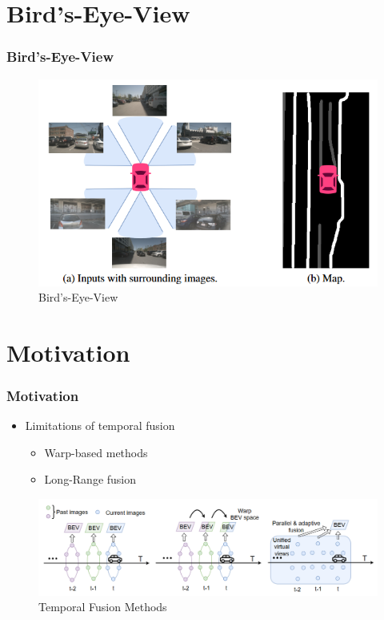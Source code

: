 \documentclass[
	12pt, %
	aspectratio=169, %
]{beamer}
\begin{document}
\section{Bird's-Eye-View}

\begin{frame}
	\frametitle{Bird's-Eye-View}

	\begin{figure}
		\centering
		\includegraphics[width=0.65\linewidth]{"./Images/BEV.png"}
		\caption{Bird's-Eye-View}
	\end{figure}
\end{frame}


\section{Motivation}

\begin{frame}
	\frametitle{Motivation}

	\begin{itemize}
		\item Limitations of temporal fusion
		\begin{itemize}
			\item Warp-based methods
			\item Long-Range fusion
		\end{itemize}
	\end{itemize}

	\begin{figure}
		\centering
		\includegraphics[width=0.9\linewidth]{"./Images/temporal_fusion_motivation.png"}
		\caption{Temporal Fusion Methods}
	\end{figure}

\end{frame}
\end{document}
